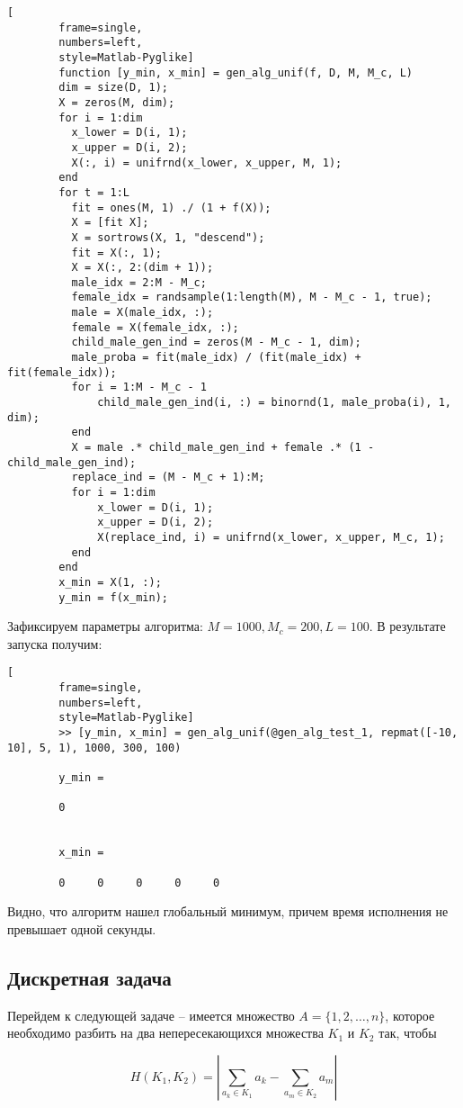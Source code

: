 \documentclass[../main.tex]{subfiles}
\begin{document}
	\begin{lstlisting}[
		frame=single,
		numbers=left,
		style=Matlab-Pyglike]
		function [y_min, x_min] = gen_alg_unif(f, D, M, M_c, L) 
		dim = size(D, 1);
		X = zeros(M, dim);
		for i = 1:dim
		  x_lower = D(i, 1);
		  x_upper = D(i, 2);
		  X(:, i) = unifrnd(x_lower, x_upper, M, 1);
		end
		for t = 1:L
		  fit = ones(M, 1) ./ (1 + f(X));
		  X = [fit X];
		  X = sortrows(X, 1, "descend");
		  fit = X(:, 1);
		  X = X(:, 2:(dim + 1));
		  male_idx = 2:M - M_c;
		  female_idx = randsample(1:length(M), M - M_c - 1, true);
		  male = X(male_idx, :);
		  female = X(female_idx, :);
		  child_male_gen_ind = zeros(M - M_c - 1, dim);
		  male_proba = fit(male_idx) / (fit(male_idx) + fit(female_idx));
		  for i = 1:M - M_c - 1
			  child_male_gen_ind(i, :) = binornd(1, male_proba(i), 1, dim);
		  end
		  X = male .* child_male_gen_ind + female .* (1 - child_male_gen_ind);
		  replace_ind = (M - M_c + 1):M;
		  for i = 1:dim
			  x_lower = D(i, 1);
			  x_upper = D(i, 2);
			  X(replace_ind, i) = unifrnd(x_lower, x_upper, M_c, 1);
		  end
		end
		x_min = X(1, :);
		y_min = f(x_min);
	\end{lstlisting}
	

	Зафиксируем параметры алгоритма: $M = 1000, M_c = 200, L = 100$. В результате запуска получим:
	
	\begin{lstlisting}[
		frame=single,
		numbers=left,
		style=Matlab-Pyglike]
		>> [y_min, x_min] = gen_alg_unif(@gen_alg_test_1, repmat([-10, 10], 5, 1), 1000, 300, 100)
		
		y_min =
		
		0
		
		
		x_min =
		
		0     0     0     0     0	
	\end{lstlisting}

	Видно, что алгоритм нашел глобальный минимум, причем время исполнения не превышает одной секунды.
	
	\subsection{Дискретная задача}
	
	Перейдем к следующей задаче -- имеется множество $A = \{1, 2, \dots, n\}$, которое необходимо разбить на два непересекающихся множества $K_1$ и $K_2$ так, чтобы 
	
	\[H(K_1, K_2) =  \left|\sum_{a_k \in K_1}a_k - \sum_{a_m \in K_2}a_m \right|\]
	
\end{document}
